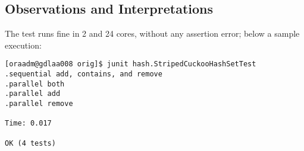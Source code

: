 \subsection{Observations and Interpretations}
The test runs fine in 2 and 24 cores, without any assertion error;
below a sample execution: \\

\begin{verbatim}
[oraadm@gdlaa008 orig]$ junit hash.StripedCuckooHashSetTest
.sequential add, contains, and remove
.parallel both
.parallel add
.parallel remove

Time: 0.017

OK (4 tests)
\end{verbatim}
\hfill


